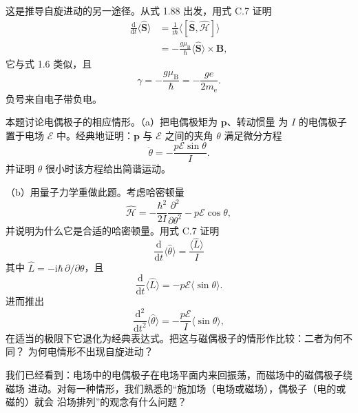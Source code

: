  这是推导自旋进动的另一途径。从式 1.88 出发，用式 C.7 证明
\begin{align*}
\frac{\mathrm{d}}{\mathrm{d}t}\langle\hat{\mathbf{S}}\rangle &= \frac{1}{\mathrm{i}\hbar}\langle[\hat{\mathbf{S}}, \hat{\mathcal{H}}]\rangle\tag{1.93}\\
&= -\frac{g\mu_{\mathrm{B}}}{\hbar}\langle\hat{\mathbf{S}}\rangle\times\mathbf{B},\tag{1.94}
\end{align*}
它与式 1.6 类似，且
\begin{equation*}
\gamma = -\frac{g\mu_{\mathrm{B}}}{\hbar} = -\frac{ge}{2m_{\mathrm{e}}}.\tag{1.95}
\end{equation*}
负号来自电子带负电。

 本题讨论电偶极子的相应情形。（a）把电偶极矩为 $\mathbf{p}$、转动惯量
为 $I$ 的电偶极子置于电场 $\boldsymbol{\mathcal{E}}$ 中。经典地证明：$\mathbf{p}$ 与
$\boldsymbol{\mathcal{E}}$ 之间的夹角 $\theta$ 满足微分方程
\begin{equation*}
\ddot{\theta} = -\frac{p\mathcal{E}\sin\theta}{I}.\tag{1.96}
\end{equation*}
并证明 $\theta$ 很小时该方程给出简谐运动。

（b）用量子力学重做此题。考虑哈密顿量
\begin{equation*}
\hat{\mathcal{H}} = -\frac{\hbar^{2}}{2I}\frac{\partial^{2}}{\partial\theta^{2}} - p\mathcal{E}\cos\theta,\tag{1.97}
\end{equation*}
并说明为什么它是合适的哈密顿量。用式 C.7 证明
\begin{equation*}
\frac{\mathrm{d}}{\mathrm{d}t}\langle\hat{\theta}\rangle = \frac{\langle\hat{L}\rangle}{I}\tag{1.98}
\end{equation*}
其中 $\hat{L}=-\mathrm{i}\hbar\,\partial/\partial\theta$，且
\begin{equation*}
\frac{\mathrm{d}}{\mathrm{d}t}\langle\hat{L}\rangle = -p\mathcal{E}\langle\sin\theta\rangle.\tag{1.99}
\end{equation*}
进而推出
\begin{equation*}
\frac{\mathrm{d}^{2}}{\mathrm{d}t^{2}}\langle\hat{\theta}\rangle = -\frac{p\mathcal{E}}{I}\langle\sin\theta\rangle,\tag{1.100}
\end{equation*}
在适当的极限下它退化为经典表达式。把这与磁偶极子的情形作比较：二者为何不同？
为何电情形不出现自旋进动？

我们已经看到：电场中的电偶极子在电场平面内来回振荡，而磁场中的磁偶极子绕磁场
进动。对每一种情形，我们熟悉的“施加场（电场或磁场），偶极子（电的或磁的）就会
沿场排列”的观念有什么问题？
